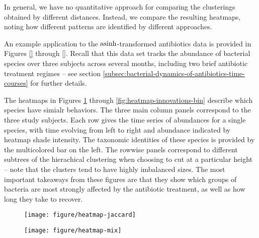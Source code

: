 \documentclass{article}
\begin{document}
In general, we have no quantitative approach for comparing the clusterings
obtained by different distances. Instead, we compare the resulting heatmaps,
noting how different patterns are identified by different approaches.

An example application to the $\mathop\mathrm{asinh}$-transformed antibiotics data is provided
in Figures \ref{} through \ref{}. Recall that this data set tracks the abundance
of bacterial species over three subjects across several months, including two
brief antibiotic treatment regimes -- see section
\ref{subsec:bacterial-dynamics-of-antibiotics-time-courses} for further details.


The heatmaps in Figures \ref{fig:heatmap-euclidean} through
\ref{fig:heatmap-innovations-bin} describe which species have simialr behaviors.
The three main column panels correspond to the three study subjects. Each row
gives the time series of abundances for a single species, with time evolving
from left to right and abundance indicated by heatmap shade intensity. The
taxonomic identities of these species is provided by the multicolored bar on the
left. The rowwise panels correspond to different subtrees of the hierachical
clustering when choosing to cut at a particular height -- note that the clusters
tend to have highly imbalanced sizes. The most important takeaways from these
figures are that they show which groups of bacteria are most strongly affected
by the antibiotic treatment, as well as how long they take to recover.

\begin{figure}[ht]
  \centering
  \caption{\label{fig:heatmap-euclidean} }
\end{figure}

\begin{figure}[ht]
  \centering
  \texttt{[image: figure/heatmap-jaccard]}
  \caption{\label{fig:heatmap-jaccard} }
\end{figure}

\begin{figure}[ht]
  \centering
  \texttt{[image: figure/heatmap-mix]}
  \caption{\label{fig:heatmap-mix} }
\end{figure}

\begin{figure}[ht]
  \centering
  \caption{\label{fig:heatmap-innovations} }
\end{figure}
\end{document}
